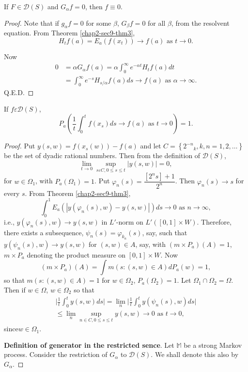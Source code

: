 \begin{thm}\label{chap2-sec9-thm4}%
  If $F \in \mathscr{D} (S)$ and $G_\alpha f = 0$, then $f
  \equiv 0$. 
\end{thm}

\begin{proof}
Note that if $g_\alpha f = 0$ for some $\beta$, $G_\beta f =0$ for all
  $\beta$, from the resolvent equation. From Theorem \ref{chap2-sec9-thm3}, 
$$
H_t f (a) = E_a (f (x_t)) \to f (a) \text{\ as\ } t \to 0.
$$

Now
\begin{align*}
 0 &= \alpha G_\alpha f (a) = \alpha
    \int^\infty_0 e^{- \alpha t} H_t f (a) dt\\ 
    & = \int^\infty_0 e^{-s} H_{s/\alpha} f (a) ds \to f (a) \text{\ as\ }
    \alpha \to \infty.  
  \end{align*}
\hfill Q.E.D.
\end{proof}

\begin{thm}\label{chap2-sec9-thm5}%
If $f \varepsilon \mathscr{D} (S)$,
$$
P_a \left(\frac{1}{t} \int^t_0 f (x_s) ds \to f (a) \text{\ as\ } t
\to 0\right) = 1. 
$$\pageoriginale
\end{thm}

\begin{proof}
Put $y (s, w) = f (x_s (w)) -f(a)$ and let $C = \left\{2^{-n}{_k},
  k,n = 1,2 , \ldots\right\}$ be the set of dyadic rational
  numbers. Then from the definition of $\mathscr{D} (S)$, 
$$
\lim_{t \to 0} \sup_{ s \varepsilon C, 0 \le s \le t}|y (s,w)|=0,
$$
for $w \in \Omega_1$, with $P_a (\Omega_1) =1$. Put
  $\varphi_n (s) = \dfrac{[2^n s] +1}{2^n}$. Then $\varphi_n (s) \to
  s$ for every $s$. From Theorem \ref{chap2-sec9-thm3},  
  $$
  \int^1_0 E_a(|y(\varphi_n (s), w) - y (s,w)|)ds \to 0 \text{\ as\ } n
  \to \infty, 
  $$
  i.e.,  $y(\varphi_n (s),w) \to y (s,w)$ in $L'$-norm on $L' ([0,1]
  \times W)$. Therefore, there exists a subsequence,
  $\psi_n(s)=\varphi_{k_n}(s)$, say, such that $y(\psi_n(s),w) \to y
  (s, w)$ for $(s, w) \in A$, say, with $(m \times P_a)(A) =
  1$, $m \times P_a$ denoting the product measure on $[0,1] \times
  W$. Now 
  $$
  (m \times P_a) (A) =\int m (s: (s, w) \in A) dP_a (w) = 1,
  $$
  so that $m (s:(s, w) \in A) =1$ for $w \in \Omega_2$,
  $P_a (\Omega_2) =1$. Let $\Omega_1 \cap \Omega_2 = \Omega$. Then if
  $w \in \Omega$, $w \in \Omega_2$ so that 
  \begin{multline*}
    \bigg|\frac{1}{t} \int^t_0 y (s,w) ds\bigg| =\lim_n \bigg|
    \frac{1}{t} \int^t_0 y (\psi_n(s),w)ds \bigg|\\ 
    \leq \lim_{n} \sup_{n
      \in C,0 \leq s \leq t} y (s,w) \to 0 \text{\ as\ } t \to 0, 
  \end{multline*}
since\pageoriginale $w \in \Omega_1$.

\medskip
\noindent 
{\textbf{Definition of generator in the restricted sence}}. Let
 $\mathbb{M}$ be a strong Markov process. Consider the restriction of
 $G_\alpha$ to $\mathscr{D} (S)$. We shall denote this also by
 $G_\alpha$. 
\end{proof}

